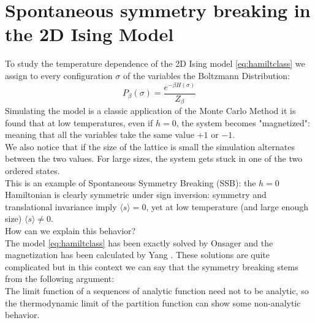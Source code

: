 \documentclass[12pt,a4paper]{article}
\begin{document}
\section{Spontaneous symmetry breaking in the 2D Ising Model}
To study the temperature dependence of the 2D Ising model \ref{eq:hamiltclass} we assign to every configuration $\sigma$ of the variables the Boltzmann Distribution:
\begin{equation}
	P_{\beta}(\sigma)=\frac{e^{-\beta H(\sigma)}}{Z_{\beta}}
\end{equation} 
Simulating the model is a classic application of the Monte Carlo Method it is found that at low temperatures, even if $h=0$, the system becomes "magnetized": meaning that all the variables take the same value $+1$ or $-1$.\\ We also notice that if the size of the lattice is small the simulation alternates between the two values. For large sizes, the system gets stuck in one of the two ordered states. \\
This is an example of Spontaneous Symmetry Breaking (SSB): the $h=0$ Hamiltonian is clearly  symmetric under sign inversion: symmetry and translational invariance imply $\langle s \rangle=0$, yet at low temperature (and large enough size) $\langle s \rangle \ne 0$.  \\ 
How can we explain this behavior?\\
The model \ref{eq:hamiltclass} has been exactly solved by Onsager \cite{Huang_1987} and the magnetization has been calculated by Yang \cite{PhysRev.85.808}. These solutions are quite complicated but in this context we can say that the symmetry breaking stems from the following argument:\\
The limit function of a sequences of analytic function need not to be analytic, so the thermodynamic limit of the partition function can show some non-analytic behavior. \\ 
\end{document}
